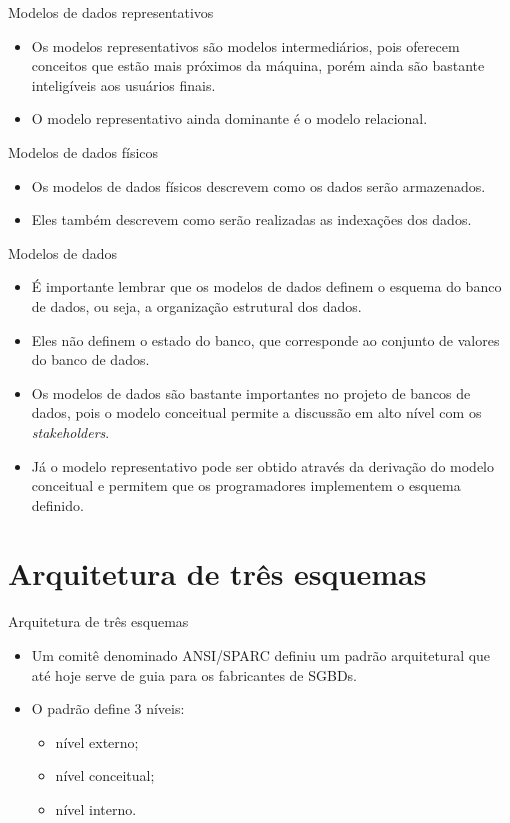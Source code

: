 \documentclass[11pt]{beamer}
\begin{document}
\begin{frame}{Modelos de dados representativos}
    \begin{itemize}
        \item Os modelos representativos são modelos intermediários, pois oferecem conceitos que estão mais próximos da máquina, porém ainda são bastante inteligíveis aos usuários finais.
        \item O modelo representativo ainda dominante é o modelo relacional.
    \end{itemize}
\end{frame}

\begin{frame}{Modelos de dados físicos}
    \begin{itemize}
        \item Os modelos de dados físicos descrevem como os dados serão armazenados.
        \item Eles também descrevem como serão realizadas as indexações dos dados.
    \end{itemize}
\end{frame}

\begin{frame}{Modelos de dados}
    \begin{itemize}
        \item É importante lembrar que os modelos de dados definem o esquema do banco de dados, ou seja, a organização estrutural dos dados.
        \item Eles não definem o estado do banco, que corresponde ao conjunto de valores do banco de dados.
        \item Os modelos de dados são bastante importantes no projeto de bancos de dados, pois o modelo conceitual permite a discussão em alto nível com os \textit{stakeholders}.
        \item Já o modelo representativo pode ser obtido através da derivação do modelo conceitual e permitem que os programadores implementem o esquema definido.
    \end{itemize}
\end{frame}

\section{Arquitetura de três esquemas}

\begin{frame}{Arquitetura de três esquemas}
    \begin{itemize}
        \item Um comitê denominado ANSI/SPARC definiu um padrão arquitetural que até hoje serve de guia para os fabricantes de SGBDs.
        \item O padrão define 3 níveis:
              \begin{itemize}
                  \item nível externo;
                  \item nível conceitual;
                  \item nível interno.
              \end{itemize}
    \end{itemize}
\end{frame}
\end{document}
